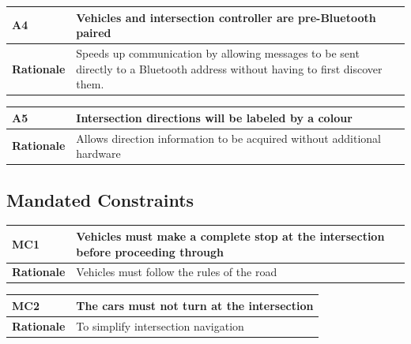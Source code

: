 \documentclass [10pt]{article}
\begin{document}
\begin{longtable}{| p{ } | p{ } | }\hline 
\rowcolor{tableCell}\textbf{A4} & Vehicles and intersection controller are pre-Bluetooth paired  \\ \hline
\textbf{Rationale} & Speeds up communication by allowing messages to be sent directly to a Bluetooth address without having to first discover them. \\ \hline
\end{longtable}

\begin{longtable}{| p{ } | p{ } | }\hline 
\rowcolor{tableCell}\textbf{A5} & Intersection directions will be labeled by a colour \\ \hline
\textbf{Rationale} & Allows direction information to be acquired without additional hardware\\ \hline 

\end{longtable}


\subsection{Mandated Constraints}


\begin{longtable}{| p{ } | p{ } | }\hline 

\rowcolor{tableCell}\textbf{MC1}& Vehicles must make a complete stop at the intersection before proceeding through\\ \hline 
\textbf{Rationale} & Vehicles must follow the rules of the road\\ \hline 

\end{longtable}


\begin{longtable}{| p{ } | p{ } | }\hline 
\rowcolor{tableCell}\textbf{MC2} & The cars must not turn at the intersection \\ \hline
\textbf{Rationale} & To simplify intersection navigation \\ \hline


\end{longtable}

\end{document}
